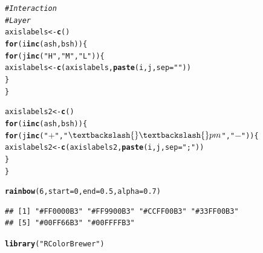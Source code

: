 \documentclass{article}\usepackage[]{graphicx}\usepackage[]{color}
\makeatletter
\newcommand{\hlnum}[1]{\textcolor[rgb]{0.686,0.059,0.569}{#1}}%
\newcommand{\hlstr}[1]{\textcolor[rgb]{0.192,0.494,0.8}{#1}}%
\newcommand{\hlcom}[1]{\textcolor[rgb]{0.678,0.584,0.686}{\textit{#1}}}%
\newcommand{\hlstd}[1]{\textcolor[rgb]{0.345,0.345,0.345}{#1}}%
\newcommand{\hlkwa}[1]{\textcolor[rgb]{0.161,0.373,0.58}{\textbf{#1}}}%
\newcommand{\hlkwb}[1]{\textcolor[rgb]{0.69,0.353,0.396}{#1}}%
\newcommand{\hlkwc}[1]{\textcolor[rgb]{0.333,0.667,0.333}{#1}}%
\newcommand{\hlkwd}[1]{\textcolor[rgb]{0.737,0.353,0.396}{\textbf{#1}}}%
\newenvironment{kframe}{%
 \def\at@end@of@kframe{}%
 \ifinner\ifhmode%
  \def\at@end@of@kframe{\end{minipage}}%
  \begin{minipage}{\columnwidth}%
 \fi\fi%
 \def\FrameCommand##1{\hskip\@totalleftmargin \hskip-\fboxsep
 \colorbox{shadecolor}{##1}\hskip-\fboxsep
     \hskip-\linewidth \hskip-\@totalleftmargin \hskip\columnwidth}%
 \MakeFramed {\advance\hsize-\width
   \@totalleftmargin\z@ \linewidth\hsize
   \@setminipage}}%
 {\par\unskip\endMakeFramed%
 \at@end@of@kframe}
\newenvironment{knitrout}{}{} %
\makeatother
\begin{document}
\begin{knitrout}
\begin{kframe}
\begin{alltt}
\hlcom{#Interaction}
\hlcom{#Layer}
\hlstd{axislabels}\hlkwb{<-}\hlkwd{c}\hlstd{()}
\hlkwa{for}\hlstd{(i} \hlkwa{in} \hlkwd{c}\hlstd{(ash,bsh))\{}
  \hlkwa{for}\hlstd{(j} \hlkwa{in} \hlkwd{c}\hlstd{(}\hlstr{"H"}\hlstd{,}\hlstr{"M"}\hlstd{,}\hlstr{"L"}\hlstd{))\{}
    \hlstd{axislabels}\hlkwb{<-}\hlkwd{c}\hlstd{(axislabels,}\hlkwd{paste}\hlstd{(i,j,}\hlkwc{sep}\hlstd{=}\hlstr{""}\hlstd{))}
  \hlstd{\}}
\hlstd{\}}

\hlstd{axislabels2}\hlkwb{<-}\hlkwd{c}\hlstd{()}
\hlkwa{for}\hlstd{(i} \hlkwa{in} \hlkwd{c}\hlstd{(ash,bsh))\{}
  \hlkwa{for}\hlstd{(j} \hlkwa{in} \hlkwd{c}\hlstd{(}\hlstr{"$+$"}\hlstd{,}\hlstr{"$\textbackslash{}\textbackslash{}pm$"}\hlstd{,}\hlstr{"$-$"}\hlstd{))\{}
    \hlstd{axislabels2}\hlkwb{<-}\hlkwd{c}\hlstd{(axislabels2,}\hlkwd{paste}\hlstd{(i,j,}\hlkwc{sep}\hlstd{=}\hlstr{"; "}\hlstd{))}
  \hlstd{\}}
\hlstd{\}}


\hlkwd{rainbow}\hlstd{(}\hlnum{6}\hlstd{,}\hlkwc{start} \hlstd{=} \hlnum{0}\hlstd{,} \hlkwc{end} \hlstd{=} \hlnum{0.5}\hlstd{,} \hlkwc{alpha} \hlstd{=} \hlnum{0.7}\hlstd{)}
\end{alltt}
\begin{verbatim}
## [1] "#FF0000B3" "#FF9900B3" "#CCFF00B3" "#33FF00B3"
## [5] "#00FF66B3" "#00FFFFB3"
\end{verbatim}
\begin{alltt}
\hlkwd{library}\hlstd{(}\hlstr{"RColorBrewer"}\hlstd{)}


\end{alltt}
\end{kframe}
\end{knitrout}
\end{document}
